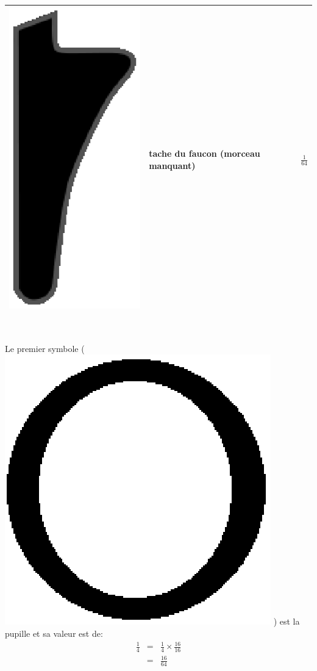 \documentclass[letterpaper, 12pt]{article}
\begin{document}
\begin{center}
\begin{tabular}{|c|l|c|}
\includegraphics[scale=0.1]{faucon.eps} & tache du faucon (morceau manquant) & {\Large$\frac{1}{64}$}\\[2mm] \hline
\end{tabular}\\
\end{center}
Le premier symbole \Big( \includegraphics[scale=0.1]{pupille.eps} \Big) est la pupille et sa valeur est de:
\begin{eqnarray*}
\frac{1}{4} &=& \frac{1}{4} \times \frac{16}{16}\\
&=& \frac{16}{64}\\
\end{eqnarray*}
\end{document}
